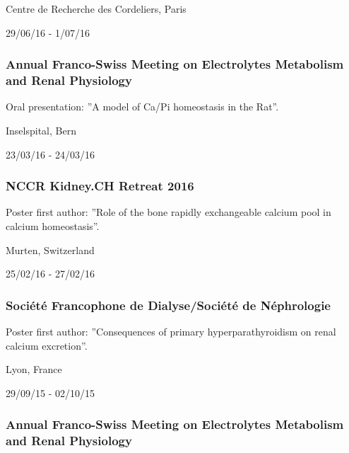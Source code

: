 \documentclass[
]{article}
\begin{document}
Centre de Recherche des Cordeliers, Paris

29/06/16 - 1/07/16

\hypertarget{annual-franco-swiss-meeting-on-electrolytes-metabolism-and-renal-physiology}{%
\subsubsection{Annual Franco-Swiss Meeting on Electrolytes Metabolism
and Renal
Physiology}\label{annual-franco-swiss-meeting-on-electrolytes-metabolism-and-renal-physiology}}

Oral presentation: ''A model of Ca/Pi homeostasis in the Rat''.

Inselspital, Bern

23/03/16 - 24/03/16

\hypertarget{nccr-kidney.ch-retreat-2016}{%
\subsubsection{NCCR Kidney.CH Retreat
2016}\label{nccr-kidney.ch-retreat-2016}}

Poster first author: ''Role of the bone rapidly exchangeable calcium
pool in calcium homeostasis''.

Murten, Switzerland

25/02/16 - 27/02/16

\hypertarget{socieux301teux301-francophone-de-dialysesocieux301teux301-de-neux301phrologie}{%
\subsubsection{Société Francophone de Dialyse/Société de
Néphrologie}\label{socieux301teux301-francophone-de-dialysesocieux301teux301-de-neux301phrologie}}

Poster first author: ''Consequences of primary hyperparathyroidism on
renal calcium excretion''.

Lyon, France

29/09/15 - 02/10/15

\hypertarget{annual-franco-swiss-meeting-on-electrolytes-metabolism-and-renal-physiology-1}{%
\subsubsection{Annual Franco-Swiss Meeting on Electrolytes Metabolism
and Renal
Physiology}\label{annual-franco-swiss-meeting-on-electrolytes-metabolism-and-renal-physiology-1}}
\end{document}
